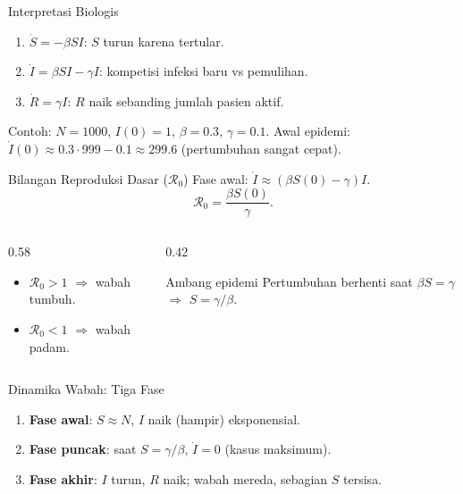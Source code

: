 \documentclass[aspectratio=32]{beamer}
\newcommand{\jsg}[1]{\textcolor{teal!60!black}{\textbf{#1}}}
\newcommand{\Rzero}{\mathcal R_0}
\begin{document}
\begin{frame}{Interpretasi Biologis}
\begin{enumerate}
  \item $\dot S=-\beta SI$: $S$ turun karena tertular.
  \item $\dot I=\beta SI-\gamma I$: kompetisi infeksi baru vs pemulihan.
  \item $\dot R=\gamma I$: $R$ naik sebanding jumlah pasien aktif.
\end{enumerate}
\vspace{0.5em}
\small Contoh: $N=1000$, $I(0)=1$, $\beta=0.3$, $\gamma=0.1$. \; Awal epidemi: $\dot I(0)\approx 0.3\cdot 999-0.1\approx 299.6$ (pertumbuhan sangat cepat).
\end{frame}

\begin{frame}{Bilangan Reproduksi Dasar ($\Rzero$)}
Fase awal: $\displaystyle \dot I \approx (\beta S(0)-\gamma)I$.
\begin{equation*}
\Rzero = \frac{\beta S(0)}{\gamma}.
\end{equation*}
\begin{columns}[T,totalwidth=\textwidth]
  \begin{column}{0.58\textwidth}
    \begin{itemize}
      \item $\Rzero>1$ $\Rightarrow$ wabah tumbuh.
      \item $\Rzero<1$ $\Rightarrow$ wabah padam.
    \end{itemize}
  \end{column}
  \begin{column}{0.42\textwidth}
    \begin{block}{Ambang epidemi}
      Pertumbuhan berhenti saat $\beta S=\gamma$ $\Rightarrow$ $S=\gamma/\beta$.
    \end{block}
  \end{column}
\end{columns}
\end{frame}

\begin{frame}{Dinamika Wabah: Tiga Fase}
\begin{enumerate}
  \item \jsg{Fase awal}: $S\approx N$, $I$ naik (hampir) eksponensial.
  \item \jsg{Fase puncak}: saat $S=\gamma/\beta$, $\dot I=0$ (kasus maksimum).
  \item \jsg{Fase akhir}: $I$ turun, $R$ naik; wabah mereda, sebagian $S$ tersisa.
\end{enumerate}
\end{frame}
\end{document}
